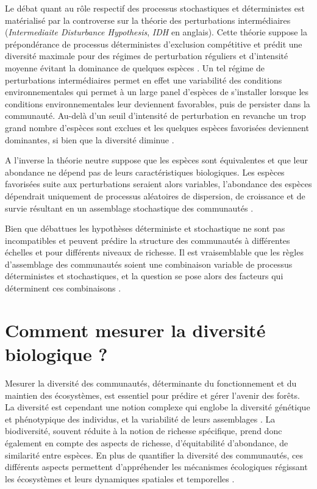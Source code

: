 \documentclass[
  11pt,
  french,
  A4paper,
  extrafontsizes,onecolumn,openright
  ]{memoir}
\begin{document}
Le débat quant au rôle respectif des processus stochastiques et
déterministes est matérialisé par la controverse sur la théorie des
perturbations intermédiaires (\emph{Intermediaite Disturbance
Hypothesis}, \emph{IDH} en anglais). Cette théorie suppose la
prépondérance de processus déterministes d'exclusion compétitive et
prédit une diversité maximale pour des régimes de perturbation réguliers
et d'intensité moyenne évitant la dominance de quelques espèces
\autocite{Molino2001}. Un tel régime de perturbations intermédiaires
permet en effet une variabilité des conditions environnementales qui
permet à un large panel d'espèces de s'installer lorsque les conditions
environnementales leur deviennent favorables, puis de persister dans la
communauté. Au-delà d'un seuil d'intensité de perturbation en revanche
un trop grand nombre d'espèces sont exclues et les quelques espèces
favorisées deviennent dominantes, si bien que la diversité diminue
\autocites{Chesson2000}{Kariuki2006a}{Berry2008a}.

A l'inverse la théorie neutre suppose que les espèces sont équivalentes
et que leur abondance ne dépend pas de leurs caractéristiques
biologiques. Les espèces favorisées suite aux perturbations seraient
alors variables, l'abondance des espèces dépendrait uniquement de
processus aléatoires de dispersion, de croissance et de survie résultant
en un assemblage stochastique des communautés \autocite{Hubbell2001}.

Bien que débattues les hypothèses déterministe et stochastique ne sont
pas incompatibles et peuvent prédire la structure des communautés à
différentes échelles et pour différents niveaux de richesse. Il est
vraisemblable que les règles d'assemblage des communautés soient une
combinaison variable de processus déterministes et stochastiques, et la
question se pose alors des facteurs qui déterminent ces combinaisons
\autocite{Chave2004}.

\section{Comment mesurer la diversité biologique
?}\label{comment-mesurer-la-diversite-biologique}

Mesurer la diversité des communautés, déterminante du fonctionnement et
du maintien des écosystèmes, est essentiel pour prédire et gérer
l'avenir des forêts. La diversité est cependant une notion complexe qui
englobe la diversité génétique et phénotypique des individus, et la
variabilité de leurs assemblages \autocite{Loreau2005}. La biodiversité,
souvent réduite à la notion de richesse spécifique, prend donc également
en compte des aspects de richesse, d'équitabilité d'abondance, de
similarité entre espèces. En plus de quantifier la diversité des
communautés, ces différents aspects permettent d'appréhender les
mécanismes écologiques régissant les écosystèmes et leurs dynamiques
spatiales et temporelles \autocites{Purvis2000}{Loreau2005}.
\end{document}
